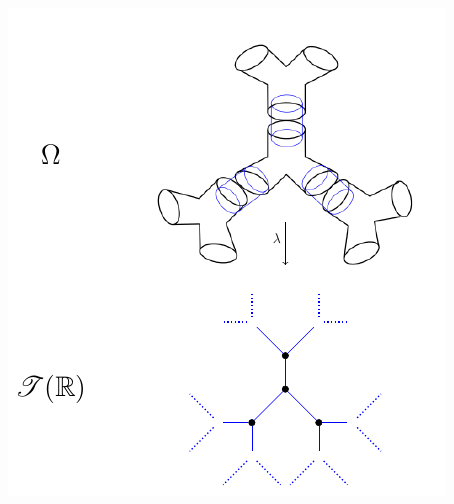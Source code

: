\documentclass[handout]{beamer}
\numberwithin{equation}{section}
\numberwithin{case}{theorem}
\newcommand{\<}{\left\langle}
\renewcommand{\>}{\right\rangle}
\begin{document}
\begin{frame}
\begin{columns}
			\begin{column}{.5\textwidth}
				\includegraphics[scale=0.75]{Drinfeld-fund.png}
			\end{column}
		\end{columns}
	\end{frame}
	
\end{document}
